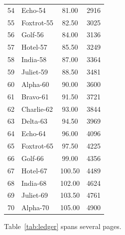 \documentclass[10pt]{article}
\begin{document}
\begin{longtable}{@{}r l S[table-format=3.2] S[table-format=4.0]@{}}
54 & Echo-54 & \num{81.00} & \num{2916} \\
55 & Foxtrot-55 & \num{82.50} & \num{3025} \\
56 & Golf-56 & \num{84.00} & \num{3136} \\
57 & Hotel-57 & \num{85.50} & \num{3249} \\
58 & India-58 & \num{87.00} & \num{3364} \\
59 & Juliet-59 & \num{88.50} & \num{3481} \\
60 & Alpha-60 & \num{90.00} & \num{3600} \\
61 & Bravo-61 & \num{91.50} & \num{3721} \\
62 & Charlie-62 & \num{93.00} & \num{3844} \\
63 & Delta-63 & \num{94.50} & \num{3969} \\
64 & Echo-64 & \num{96.00} & \num{4096} \\
65 & Foxtrot-65 & \num{97.50} & \num{4225} \\
66 & Golf-66 & \num{99.00} & \num{4356} \\
67 & Hotel-67 & \num{100.50} & \num{4489} \\
68 & India-68 & \num{102.00} & \num{4624} \\
69 & Juliet-69 & \num{103.50} & \num{4761} \\
70 & Alpha-70 & \num{105.00} & \num{4900} \\
\end{longtable}
Table~\ref{tab:ledger} spans several pages.\label{LastPage}
\end{document}
